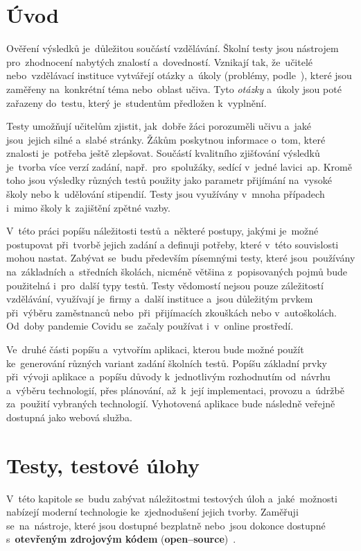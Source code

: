 \documentclass[11pt,a4paper]{report}
\begin{document}
    \setcounter{page}{1} %
    \tableofcontents
    
    \clearpage %
	
	\chapter{Úvod}
        Ověření výsledků je~důležitou součástí vzdělávání. Školní testy jsou nástrojem pro~zhodnocení nabytých znalostí a~dovedností. Vznikají tak, že~učitelé nebo~vzdělávací instituce vytvářejí otázky a~úkoly (problémy, podle~\cite{zhouf:tvorbamatproblemu}), které jsou zaměřeny na~konkrétní téma nebo~oblast učiva. Tyto \emph{otázky} a~úkoly jsou poté zařazeny do~testu, který je~studentům předložen k~vyplnění.

        Testy umožňují učitelům zjistit, jak~dobře žáci porozuměli učivu a~jaké jsou~jejich silné a~slabé stránky. Žákům poskytnou informace o~tom, které znalosti je~potřeba ještě zlepšovat. Součástí kvalitního zjišťování výsledků je~tvorba více verzí zadání, např.~pro~spolužáky, sedící v~jedné lavici~ap. Kromě toho jsou výsledky různých testů použity jako parametr přijímání na~vysoké školy nebo k~udělování stipendií. Testy jsou využívány v~mnoha případech i~mimo školy k~zajištění zpětné vazby.
        
        V~této práci popíšu náležitosti testů a~některé postupy, jakými je~možné postupovat při~tvorbě jejich zadání a definuji potřeby, které v~této souvislosti mohou nastat. Zabývat se~budu především písemnými testy, které jsou~používány na~základních a~středních školách, nicméně většina z~popisovaných pojmů bude použitelná i~pro~další typy testů. Testy vědomostí nejsou pouze záležitostí vzdělávání, využívají je~firmy a~další instituce a~jsou důležitým prvkem při~výběru zaměstnanců nebo~při~přijímacích zkouškách nebo v~autoškolách. Od~doby pandemie Covidu se~začaly používat i~v~online prostředí.
        
        Ve~druhé části popíšu a~vytvořím aplikaci, kterou bude možné použít ke~generování různých variant zadání školních testů. Popíšu základní prvky při~vývoji aplikace a~popíšu důvody k~jednotlivým rozhodnutím od~návrhu a~výběru technologií, přes plánování, až~k~její implementaci, provozu a~údržbě za~použití vybraných technologií. Vyhotovená aplikace bude následně veřejně dostupná jako webová služba.

    \chapter{Testy, testové úlohy}
         V~této kapitole se~budu zabývat náležitostmi testových úloh a~jaké~možnosti nabízejí moderní technologie ke~zjednodušení jejich tvorby. Zaměřuji se~na~nástroje, které jsou dostupné bezplatně nebo~jsou dokonce dostupné s~\textbf{otevřeným zdrojovým kódem} (\textbf{open--source})~\cite{fogel:opensource}.
\end{document}
